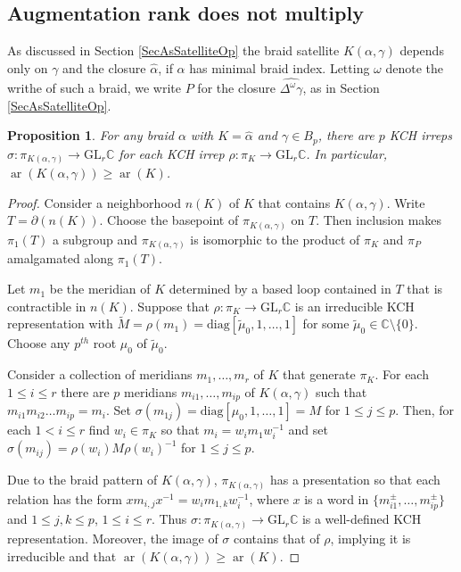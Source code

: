 \documentclass[11pt]{amsart}
\def\C{{\mathbb C}}
\def\s{{\sigma}}
\def\ar{\operatorname{ar}}
\newtheorem{prop}[thm]{Proposition}
\theoremstyle{definition}
\begin{document}
\subsection{Augmentation rank does not multiply}
\label{SecMultiplic}

As discussed in Section \ref{SecAsSatelliteOp} the braid satellite $K(\alpha,\gamma)$ depends only on $\gamma$ and the closure $\hat{\alpha}$, if $\alpha$ has minimal braid index. Letting $\omega$ denote the writhe of such a braid, we write $P$ for the closure $\widehat{\Delta^\omega\gamma}$, as in Section \ref{SecAsSatelliteOp}.

\begin{prop}For any braid $\alpha$ with $K=\hat{\alpha}$ and $\gamma\in B_p$, there are $p$ KCH irreps $\s:\pi_{K(\alpha,\gamma)}\to\text{GL}_r\C$ for each KCH irrep $\rho:\pi_K\to\text{GL}_r\C$. In particular, $\ar(K(\alpha,\gamma)) \ge \ar(K)$.
\label{ThmCompanionRank}
\end{prop}
\begin{proof}Consider a neighborhood $n(K)$ of $K$ that contains $K(\alpha,\gamma)$. Write $T=\partial(n(K))$. Choose the basepoint of $\pi_{K(\alpha,\gamma)}$ on $T$. Then inclusion makes $\pi_1(T)$ a subgroup and $\pi_{K(\alpha,\gamma)}$ is isomorphic to the product of $\pi_K$ and $\pi_P$ amalgamated along $\pi_1(T)$.

Let $m_1$ be the meridian of $K$ determined by a based loop contained in $T$ that is contractible in $n(K)$. Suppose that $\rho:\pi_K\to\text{GL}_r\mathbb C$ is an irreducible KCH representation with $\widetilde M = \rho(m_1) = \text{diag}[\widetilde\mu_0,1,\ldots,1]$ for some $\widetilde\mu_0\in\mathbb C\setminus\{0\}$. Choose any $p^{th}$ root $\mu_0$ of $\widetilde\mu_0$. 

Consider a collection of meridians $m_1,\ldots,m_r$ of $K$ that generate $\pi_K$. For each $1\le i\le r$ there are $p$ meridians $m_{i1},\ldots,m_{ip}$ of $K(\alpha,\gamma)$ such that $m_{i1}m_{i2}\ldots m_{ip} = m_i$. Set $\s(m_{1j}) = \text{diag}[\mu_0,1,\ldots,1] = M$ for $1\le j\le p$. Then, for each $1< i\le r$ find $w_i\in\pi_K$ so that $m_i = w_im_1w_i^{-1}$ and set $\s(m_{ij}) = \rho(w_i)M\rho(w_i)^{-1}$ for $1\le j\le p$.

Due to the braid pattern of $K(\alpha,\gamma)$, $\pi_{K(\alpha,\gamma)}$ has a presentation so that each relation has the form $xm_{i,j}x^{-1} = w_im_{1,k}w_i^{-1}$, where $x$ is a word in $\{m_{i1}^{\pm},\ldots,m_{ip}^{\pm}\}$ and $1\le j, k\le p$, $1\le i\le r$. Thus $\s:\pi_{K(\alpha,\gamma)}\to\text{GL}_r\mathbb C$ is a well-defined KCH representation. Moreover, the image of $\s$ contains that of $\rho$, implying it is irreducible and that $\ar(K(\alpha,\gamma))\ge \ar(K)$.
\end{proof}
\end{document}

